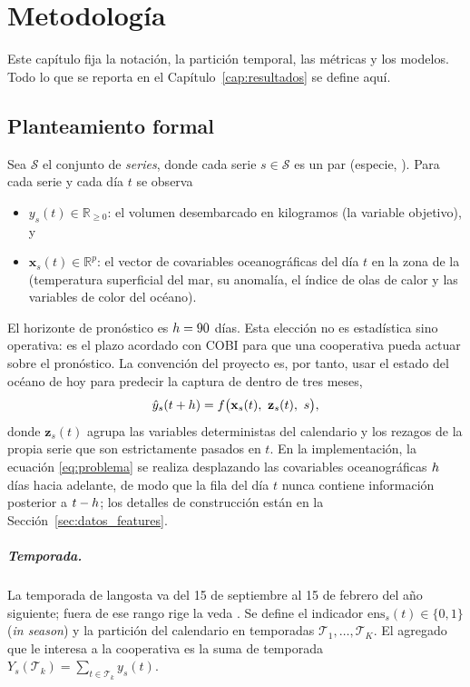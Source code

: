 \chapter{Metodología}
\label{cap:metodologia}

Este capítulo fija la notación, la partición temporal, las métricas y los modelos. Todo lo que
se reporta en el Capítulo~\ref{cap:resultados} se define aquí.

\section{Planteamiento formal}
\label{sec:met_formal}

Sea $\mathcal{S}$ el conjunto de \emph{series}, donde cada serie $s \in \mathcal{S}$ es un par
(especie, \ue{}). Para cada serie y cada día $t$ se observa

\begin{itemize}
  \item $y_s(t) \in \mathbb{R}_{\geq 0}$: el volumen desembarcado en kilogramos (la variable
  objetivo), y
  \item $\mathbf{x}_s(t) \in \mathbb{R}^{p}$: el vector de covariables oceanográficas del día
  $t$ en la zona de la \ue{} (temperatura superficial del mar, su anomalía, el índice de olas
  de calor y las variables de color del océano).
\end{itemize}

El horizonte de pronóstico es $h = 90$ días. Esta elección no es estadística sino
operativa: es el plazo acordado con COBI para que una cooperativa pueda actuar sobre el
pronóstico. La convención del proyecto es, por tanto, usar el estado del océano de hoy para
predecir la captura de dentro de tres meses,
\begin{equation}
  \hat{y}_s(t+\horizonte) = f\big(\mathbf{x}_s(t),\ \mathbf{z}_s(t),\ s\big),
  \label{eq:problema}
\end{equation}
donde $\mathbf{z}_s(t)$ agrupa las variables deterministas del calendario y los rezagos de la
propia serie que son estrictamente pasados en $t$. En la implementación, la ecuación
\eqref{eq:problema} se realiza desplazando las covariables oceanográficas $h$ días
hacia adelante, de modo que la fila del día $t$ nunca contiene información posterior a
$t-h$; los detalles de construcción están en la Sección~\ref{sec:datos_features}.

\paragraph{Temporada.} La temporada de langosta va del 15 de septiembre al 15 de febrero del
año siguiente; fuera de ese rango rige la veda \citep{nom006pesc2016}. Se define el indicador $\mathrm{ens}_s(t) \in
\{0,1\}$ (\emph{in season}) y la partición del calendario en temporadas $\mathcal{T}_1, \ldots,
\mathcal{T}_K$. El agregado que le interesa a la cooperativa es la suma de temporada
$Y_s(\mathcal{T}_k) = \sum_{t \in \mathcal{T}_k} y_s(t)$.

